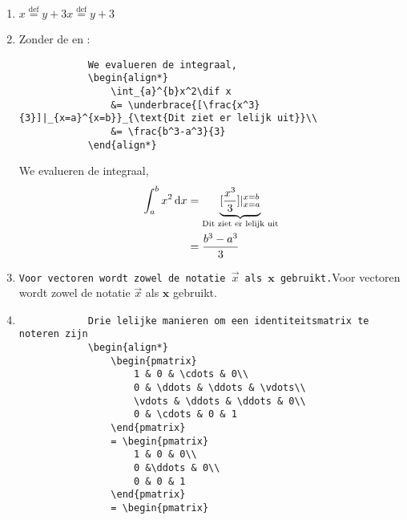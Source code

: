 \documentclass{article}
\newenvironment{demobox}{
    \begin{adjustbox}{frame=1pt 10pt}%
        \begin{minipage}{\linewidth-22pt}
}{
        \end{minipage}
    \end{adjustbox}
}
\begin{document}
\begin{enumerate}
        \item \texttt{$ x\overset{\text{def}}{=} y+3 $}\qquad $ x\overset{\text{def}}{=} y+3 $
        \item Zonder de \texttt{\left} en \texttt{\right}:        
        \begin{verbatim}
            We evalueren de integraal,
            \begin{align*}
                \int_{a}^{b}x^2\dif x
                &= \underbrace{[\frac{x^3}{3}]|_{x=a}^{x=b}}_{\text{Dit ziet er lelijk uit}}\\
                &= \frac{b^3-a^3}{3}
            \end{align*}
        \end{verbatim}
        \begin{demobox}
            We evalueren de integraal,
            \begin{align*}
                \int_{a}^{b}x^2\dif x &= \underbrace{[\frac{x^3}{3}]|_{x=a}^{x=b}}_{\text{Dit ziet er lelijk uit}}\\
                &= \frac{b^3-a^3}{3}
            \end{align*}
        \end{demobox}
        \item \texttt{Voor vectoren wordt zowel de notatie $ \vec{x} $ als $ \mathbf{x} $ gebruikt.}\qquad Voor vectoren wordt zowel de notatie $ \vec{x} $ als $ \mathbf{x} $ gebruikt.
        \item
         \begin{verbatim}
            Drie lelijke manieren om een identiteitsmatrix te noteren zijn
            \begin{align*}
                \begin{pmatrix}
                    1 & 0 & \cdots & 0\\
                    0 & \ddots & \ddots & \vdots\\
                    \vdots & \ddots & \ddots & 0\\
                    0 & \cdots & 0 & 1
                \end{pmatrix}
                = \begin{pmatrix}
                    1 & 0 & 0\\
                    0 &\ddots & 0\\
                    0 & 0 & 1
                \end{pmatrix}
                = \begin{pmatrix}

\end{verbatim}
\end{enumerate}
\end{document}
